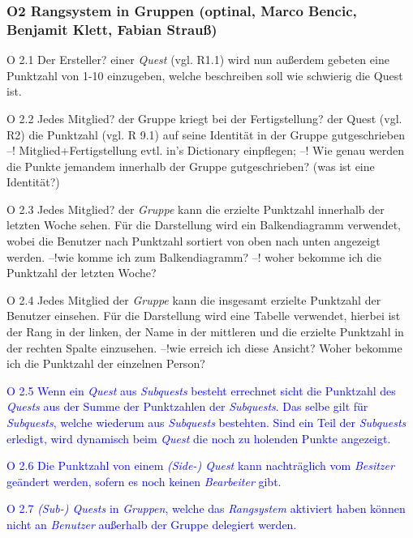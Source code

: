 \documentclass{article}
\begin{document}
\subsubsection{O2 Rangsystem in Gruppen (optinal, Marco Bencic, Benjamit Klett, Fabian Strauß)}
	\begin{itemize}
		\item{O 2.1} Der Ersteller? einer \textit{Quest} (vgl. R1.1) wird nun außerdem gebeten eine Punktzahl von 1-10 einzugeben, welche beschreiben soll wie schwierig die Quest ist.
		\item{O 2.2} Jedes Mitglied? der Gruppe kriegt bei der Fertigstellung? der Quest (vgl. R2) die Punktzahl (vgl. R 9.1) auf seine Identität in der Gruppe gutgeschrieben --! Mitglied+Fertigstellung evtl. in's Dictionary einpflegen; --! Wie genau werden die Punkte jemandem innerhalb der Gruppe gutgeschrieben? (was ist eine Identität?)
		\item{O 2.3} Jedes Mitglied? der \textit{Gruppe} kann die erzielte Punktzahl innerhalb der letzten Woche sehen. Für die Darstellung wird ein Balkendiagramm verwendet, wobei die Benutzer nach Punktzahl sortiert von oben nach unten angezeigt werden. --!wie komme ich zum Balkendiagramm? --! woher bekomme ich die Punktzahl der letzten Woche?
		\item{O 2.4} Jedes Mitglied der \textit{Gruppe} kann die insgesamt erzielte Punktzahl der Benutzer einsehen. Für die Darstellung wird eine Tabelle verwendet, hierbei ist der Rang in der linken, der Name in der mittleren und die erzielte Punktzahl in der rechten Spalte einzusehen. --!wie erreich ich diese Ansicht? Woher bekomme ich die Punktzahl der einzelnen Person?
		\textcolor{blue}
		{
		\item{O 2.5} Wenn ein \textit{Quest} aus \textit{Subquests} besteht errechnet sicht die Punktzahl des \textit{Quests} aus der Summe der Punktzahlen der \textit{Subquests}. Das selbe gilt für \textit{Subquests}, welche wiederum aus \textit{Subquests} bestehten. Sind ein Teil der \textit{Subquests} erledigt, wird dynamisch beim \textit{Quest} die noch zu holenden Punkte angezeigt.
		\item{O 2.6} Die Punktzahl von einem \textit{(Side-) Quest} kann nachträglich vom \textit{Besitzer} geändert werden, sofern es noch keinen \textit{Bearbeiter} gibt.
		\item{O 2.7} \textit{(Sub-) Quests} in \textit{Gruppen}, welche das \textit{Rangsystem} aktiviert haben können nicht an \textit{Benutzer} außerhalb der Gruppe delegiert werden. 
		}


	\end{itemize}
\end{document}
